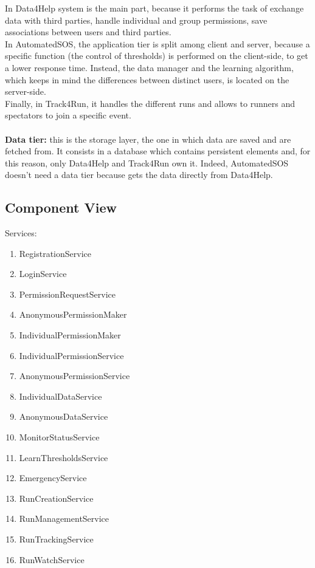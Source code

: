 \documentclass[a4paper]{article}
\begin{document}
In Data4Help system is the main part, because it performs the task of exchange data with third parties, handle individual and group permissions, save associations between users and third parties.\\
In AutomatedSOS, the application tier is split among client and server, because a specific function (the control of thresholds) is performed on the client-side, to get a lower response time. Instead, the data manager and the learning algorithm, which keeps in mind the differences between distinct users, is located on the server-side.\\
Finally, in Track4Run, it handles the different runs and allows to runners and spectators to join a specific event.\\ \\
\textbf{Data tier:} this is the storage layer, the one in which data are saved and are fetched from. It consists in a database which contains persistent elements and, for this reason, only Data4Help and Track4Run own it. Indeed, AutomatedSOS doesn't need a data tier because gets the data directly from Data4Help.
\clearpage

\subsection{Component View}
Services:
\begin{enumerate}
    \item RegistrationService
    \item LoginService
    \item PermissionRequestService %
    \item AnonymousPermissionMaker
    \item IndividualPermissionMaker
    \item IndividualPermissionService %
    \item AnonymousPermissionService %
    \item IndividualDataService %
    \item AnonymousDataService %
    
    \item MonitorStatusService
    \item LearnThresholdsService
    \item EmergencyService
    
    \item RunCreationService %
    \item RunManagementService %
    \item RunTrackingService %
    \item RunWatchService %
    
\end{enumerate}
\end{document}
